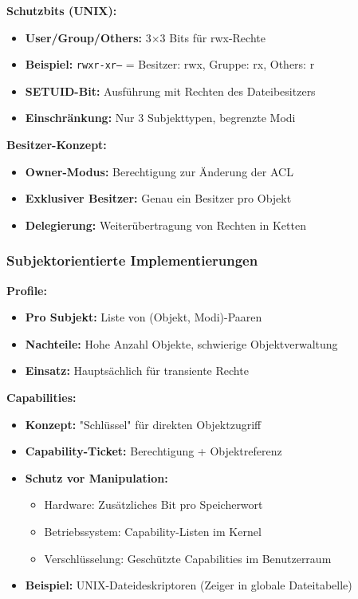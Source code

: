 \documentclass[9pt,a4paper]{extarticle}
\begin{document}
\begin{multicols*}{2}
\textbf{Schutzbits (UNIX):}
\begin{itemize}
\item \textbf{User/Group/Others:} 3×3 Bits für rwx-Rechte
\item \textbf{Beispiel:} \texttt{rwxr-xr--} = Besitzer: rwx, Gruppe: rx, Others: r
\item \textbf{SETUID-Bit:} Ausführung mit Rechten des Dateibesitzers
\item \textbf{Einschränkung:} Nur 3 Subjekttypen, begrenzte Modi
\end{itemize}

\textbf{Besitzer-Konzept:}
\begin{itemize}
\item \textbf{Owner-Modus:} Berechtigung zur Änderung der ACL
\item \textbf{Exklusiver Besitzer:} Genau ein Besitzer pro Objekt
\item \textbf{Delegierung:} Weiterübertragung von Rechten in Ketten
\end{itemize}

\subsubsection{Subjektorientierte Implementierungen}
\textbf{Profile:}
\begin{itemize}
\item \textbf{Pro Subjekt:} Liste von (Objekt, Modi)-Paaren
\item \textbf{Nachteile:} Hohe Anzahl Objekte, schwierige Objektverwaltung
\item \textbf{Einsatz:} Hauptsächlich für transiente Rechte
\end{itemize}

\textbf{Capabilities:}
\begin{itemize}
\item \textbf{Konzept:} "Schlüssel" für direkten Objektzugriff
\item \textbf{Capability-Ticket:} Berechtigung + Objektreferenz
\item \textbf{Schutz vor Manipulation:}
  \begin{itemize}
  \item Hardware: Zusätzliches Bit pro Speicherwort
  \item Betriebssystem: Capability-Listen im Kernel
  \item Verschlüsselung: Geschützte Capabilities im Benutzerraum
  \end{itemize}
\item \textbf{Beispiel:} UNIX-Dateideskriptoren (Zeiger in globale Dateitabelle)
\end{itemize}


\end{multicols*}
\end{document}
